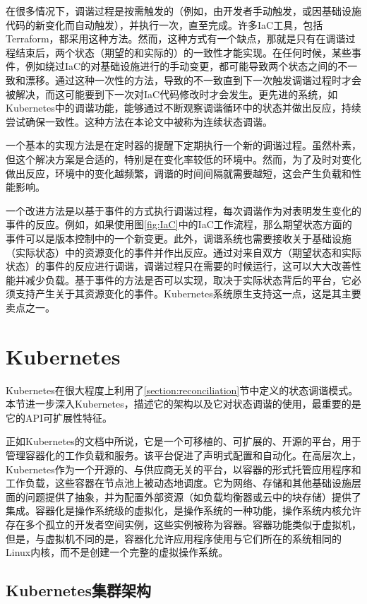 \documentclass[macfonts,master]{njuthesis}
\begin{document}
在很多情况下，调谐过程是按需触发的（例如，由开发者手动触发，或因基础设施代码的新变化而自动触发），并执行一次，直至完成。许多IaC工具，包括Terraform，都采用这种方法。然而，这种方式有一个缺点，那就是只有在调谐过程结束后，两个状态（期望的和实际的）的一致性才能实现。在任何时候，某些事件，例如绕过IaC的对基础设施进行的手动变更，都可能导致两个状态之间的不一致和漂移。通过这种一次性的方法，导致的不一致直到下一次触发调谐过程时才会被解决，而这可能要到下一次对IaC代码修改时才会发生。更先进的系统，如Kubernetes中的调谐功能，能够通过不断观察调谐循环中的状态并做出反应，持续尝试确保一致性。这种方法在本论文中被称为连续状态调谐。

一个基本的实现方法是在定时器的提醒下定期执行一个新的调谐过程。虽然朴素，但这个解决方案是合适的，特别是在变化率较低的环境中。然而，为了及时对变化做出反应，环境中的变化越频繁，调谐的时间间隔就需要越短，这会产生负载和性能影响。

一个改进方法是以基于事件的方式执行调谐过程，每次调谐作为对表明发生变化的事件的反应。例如，如果使用图\ref{fig:IaC}中的IaC工作流程，那么期望状态方面的事件可以是版本控制中的一个新变更。此外，调谐系统也需要接收关于基础设施（实际状态）中的资源变化的事件并作出反应。通过对来自双方（期望状态和实际状态）的事件的反应进行调谐，调谐过程只在需要的时候运行，这可以大大改善性能并减少负载。基于事件的方法是否可以实现，取决于实际状态背后的平台，它必须支持产生关于其资源变化的事件。Kubernetes系统原生支持这一点，这是其主要卖点之一。

\section{Kubernetes}

Kubernetes在很大程度上利用了\ref{section:reconciliation}节中定义的状态调谐模式。本节进一步深入Kubernetes，描述它的架构以及它对状态调谐的使用，最重要的是它的API可扩展性特征。

正如Kubernetes的文档中所说，它是一个可移植的、可扩展的、开源的平台，用于管理容器化的工作负载和服务。该平台促进了声明式配置和自动化\cite{whatisk8s}。在高层次上，Kubernetes作为一个开源的、与供应商无关的平台，以容器的形式托管应用程序和工作负载，这些容器在节点池上被动态地调度。它为网络、存储和其他基础设施层面的问题提供了抽象，并为配置外部资源（如负载均衡器或云中的块存储）提供了集成。容器化是操作系统级的虚拟化，是操作系统的一种功能，操作系统内核允许存在多个孤立的开发者空间实例，这些实例被称为容器。容器功能类似于虚拟机，但是，与虚拟机不同的是，容器化允许应用程序使用与它们所在的系统相同的Linux内核，而不是创建一个完整的虚拟操作系统。

\subsection{Kubernetes集群架构}
\end{document}
